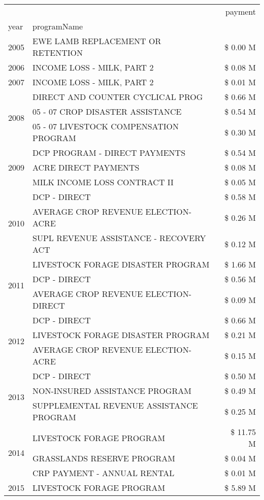 \begin{tabular}{llr}
\toprule
 &  & payment \\
year & programName &  \\
\midrule
2005 & EWE LAMB REPLACEMENT OR RETENTION & \$ 0.00 M \\
\cline{1-3}
2006 & INCOME LOSS - MILK, PART 2 & \$ 0.08 M \\
\cline{1-3}
2007 & INCOME LOSS - MILK, PART 2 & \$ 0.01 M \\
\cline{1-3}
\multirow[t]{3}{*}{2008} & DIRECT AND COUNTER CYCLICAL PROG & \$ 0.66 M \\
 & 05 - 07 CROP DISASTER ASSISTANCE & \$ 0.54 M \\
 & 05 - 07 LIVESTOCK COMPENSATION PROGRAM & \$ 0.30 M \\
\cline{1-3}
\multirow[t]{3}{*}{2009} & DCP PROGRAM - DIRECT PAYMENTS & \$ 0.54 M \\
 & ACRE DIRECT PAYMENTS & \$ 0.08 M \\
 & MILK INCOME LOSS CONTRACT II & \$ 0.05 M \\
\cline{1-3}
\multirow[t]{3}{*}{2010} & DCP - DIRECT & \$ 0.58 M \\
 & AVERAGE CROP REVENUE ELECTION-ACRE & \$ 0.26 M \\
 & SUPL REVENUE ASSISTANCE - RECOVERY ACT & \$ 0.12 M \\
\cline{1-3}
\multirow[t]{3}{*}{2011} & LIVESTOCK FORAGE DISASTER PROGRAM & \$ 1.66 M \\
 & DCP - DIRECT & \$ 0.56 M \\
 & AVERAGE CROP REVENUE ELECTION-DIRECT & \$ 0.09 M \\
\cline{1-3}
\multirow[t]{3}{*}{2012} & DCP - DIRECT & \$ 0.66 M \\
 & LIVESTOCK FORAGE DISASTER PROGRAM & \$ 0.21 M \\
 & AVERAGE CROP REVENUE ELECTION-ACRE & \$ 0.15 M \\
\cline{1-3}
\multirow[t]{3}{*}{2013} & DCP - DIRECT & \$ 0.50 M \\
 & NON-INSURED ASSISTANCE PROGRAM & \$ 0.49 M \\
 & SUPPLEMENTAL REVENUE ASSISTANCE PROGRAM & \$ 0.25 M \\
\cline{1-3}
\multirow[t]{3}{*}{2014} & LIVESTOCK FORAGE PROGRAM & \$ 11.75 M \\
 & GRASSLANDS RESERVE PROGRAM & \$ 0.04 M \\
 & CRP PAYMENT - ANNUAL RENTAL & \$ 0.01 M \\
\cline{1-3}
\multirow[t]{3}{*}{2015} & LIVESTOCK FORAGE PROGRAM & \$ 5.89 M \\

\end{tabular}
